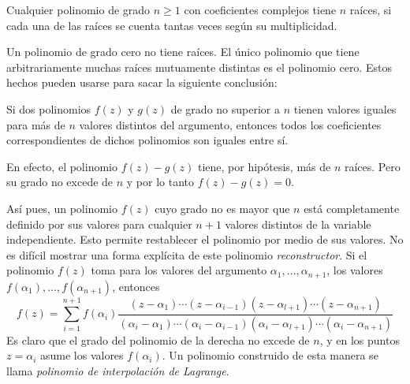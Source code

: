 \begin{tcolorbox}[
    theorem style=change apart,
    enhanced,
    lower separated=false,
    breakable,
    boxrule=0pt,
    frame hidden,
    colback=black!7!white,
    coltitle=black,
    boxed title style={colframe=white, colback=white, boxrule=0pt},
    fontupper=\normalsize,
    before upper={\abovedisplayskip=8pt\belowdisplayskip=8pt},
    left=1mm,
    right=1mm,
    top=1mm,
    bottom=1mm,
    sharp corners,
]
    Cualquier polinomio de grado $n \geq 1$ con coeficientes complejos tiene $n$ raíces, si cada una de las raíces se cuenta tantas veces según su multiplicidad.\label{CONSECUENCIA1_FUNDAMENTAL}
\end{tcolorbox}

Un polinomio de grado cero no tiene raíces. El único polinomio que tiene arbitrariamente muchas raíces mutuamente distintas es el polinomio cero. Estos hechos pueden usarse para sacar la siguiente conclusión:

\begin{tcolorbox}[
    theorem style=change apart,
    enhanced,
    lower separated=false,
    breakable,
    boxrule=0pt,
    frame hidden,
    colback=black!7!white,
    coltitle=black,
    boxed title style={colframe=white, colback=white, boxrule=0pt},
    fontupper=\normalsize,
    before upper={\abovedisplayskip=8pt\belowdisplayskip=8pt},
    left=1mm,
    right=1mm,
    top=1mm,
    bottom=1mm,
    sharp corners,
]
    Si dos polinomios $f(z)$ y $g(z)$ de grado no superior a $n$ tienen valores iguales para más de $n$ valores distintos del argumento, entonces todos los coeficientes correspondientes de dichos polinomios son iguales entre sí.
\end{tcolorbox}

En efecto, el polinomio $f(z) - g (z)$ tiene, por hipótesis, más de $n$ raíces. Pero su grado no excede de $n$ y por lo tanto $f (z) - g (z) = 0$.

Así pues, un polinomio $f(z)$ cuyo grado no es mayor que $n$ está completamente definido por sus valores para cualquier $n + 1$ valores distintos de la variable independiente. Esto permite restablecer el polinomio por medio de sus valores. No es difícil mostrar una forma explícita de este polinomio \textit{reconstructor}. Si el polinomio $f(z)$ toma para los valores del argumento $\alpha_1,  \dots,  \alpha_{n+1}$, los valores $f(\alpha_1),  \dots,  f(\alpha_{n+1})$, entonces
$$f(z)=\sum_{i=1}^{n+1} f(\alpha_i) \frac{(z-\alpha_1) \cdots (z-\alpha_{i-1})(z-\alpha_{l+1}) \cdots (z-\alpha_{n+1})}{(\alpha_i - \alpha_1) \cdots (\alpha_i - \alpha_{i-1})(\alpha_i - \alpha_{l+1}) \cdots (\alpha_i - \alpha_{n+1})}$$
Es claro que el grado del polinomio de la derecha no excede de $n$, y en los puntos $z = \alpha_i$ asume los valores $f (\alpha_i)$. Un polinomio construido de esta manera se llama \textit{polinomio de interpolación de Lagrange}.

